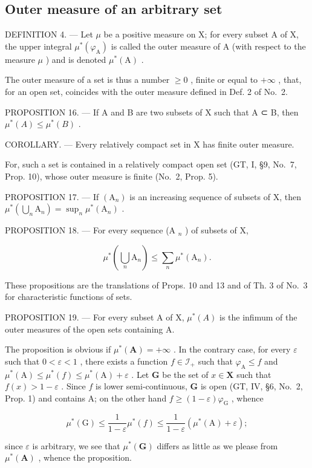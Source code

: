 \subsection{Outer measure of an arbitrary set}

DEFINITION 4. --- Let \(\mu\) be a positive measure on X; for every subset A of X, the upper integral \(\mu^{*}(\varphi_{\mathrm{A}})\) is called the outer measure of A (with respect to the measure \(\mu\) ) and is denoted \(\mu^{*}(\mathrm{A})\) .

The outer measure of a set is thus a number \(\geqslant0\) , finite or equal to \(+\infty\) , that, for an open set, coincides with the outer measure defined in Def. 2 of No.~2.

PROPOSITION 16. --- If A and B are two subsets of X such that A ⊂ B, then \(\mu^{*}(A) \leqslant \mu^{*}(B)\) .

COROLLARY. --- Every relatively compact set in X has finite outer measure.

For, such a set is contained in a relatively compact open set (GT, I, §9, No.~7, Prop. 10), whose outer measure is finite (No.~2, Prop. 5).

PROPOSITION 17. --- If \((\mathrm{A}_{n})\) is an increasing sequence of subsets of X, then \(\mu^{*}(\bigcup_{n}\mathrm{A}_{n})=\sup_{n}\mu^{*}(\mathrm{A}_{n})\) .

PROPOSITION 18. --- For every sequence (A \(_{n}\) ) of subsets of X,

\[
\mu^ {*} \left(\bigcup_ {n} \mathrm{A} _ {n}\right) \leqslant \sum_ {n} \mu^ {*} (\mathrm{A} _ {n}).
\]

These propositions are the translations of Props. 10 and 13 and of Th. 3 of No.~3 for characteristic functions of sets.

PROPOSITION 19. --- For every subset A of X, \(\mu^{*}(A)\) is the infimum of the outer measures of the open sets containing A.

The proposition is obvious if \(\mu^{*}(\mathbf{A}) = +\infty\) . In the contrary case, for every \(\varepsilon\) such that \(0 < \varepsilon < 1\) , there exists a function \(f \in \mathcal{I}_{+}\) such that \(\varphi_{\mathrm{A}} \leqslant f\) and \(\mu^{*}(\mathrm{A}) \leqslant \mu^{*}(f) \leqslant \mu^{*}(\mathrm{A}) + \varepsilon\) . Let \(\mathbf{G}\) be the set of \(x \in \mathbf{X}\) such that \(f(x) > 1 - \varepsilon\) . Since \(f\) is lower semi-continuous, \(\mathbf{G}\) is open (GT, IV, §6, No.~2, Prop. 1) and contains A; on the other hand \(f \geqslant (1 - \varepsilon)\varphi_{\mathrm{G}}\) , whence

\[
\mu^ {*} (\mathrm{G}) \leqslant \frac {1}{1 - \varepsilon} \mu^ {*} (f) \leqslant \frac {1}{1 - \varepsilon} \left(\mu^ {*} (\mathrm{A}) + \varepsilon\right);
\]

since \(\varepsilon\) is arbitrary, we see that \(\mu^{*}(\mathbf{G})\) differs as little as we please from \(\mu^{*}(\mathbf{A})\) , whence the proposition.

